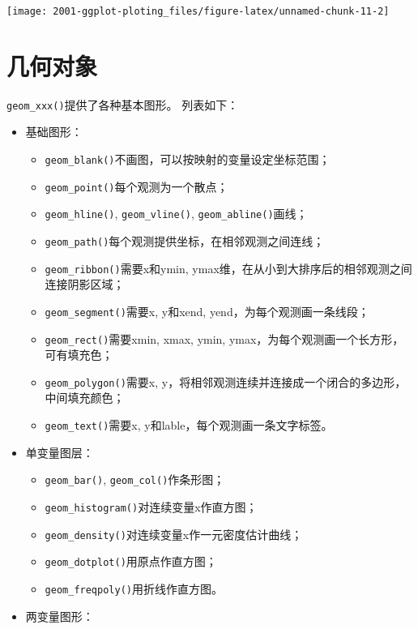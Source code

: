 \documentclass[
]{book}
\providecommand{\tightlist}{%
  \setlength{\itemsep}{0pt}\setlength{\parskip}{0pt}}
\begin{document}
\begin{center}\texttt{[image: 2001-ggplot-ploting\_files/figure-latex/unnamed-chunk-11-2]} \end{center}

\hypertarget{ux51e0ux4f55ux5bf9ux8c61}{%
\section{几何对象}\label{ux51e0ux4f55ux5bf9ux8c61}}

\texttt{geom\_xxx()}提供了各种基本图形。 列表如下：

\begin{itemize}
\item
  基础图形：

  \begin{itemize}
  \tightlist
  \item
    \texttt{geom\_blank()}不画图，可以按映射的变量设定坐标范围；
  \item
    \texttt{geom\_point()}每个观测为一个散点；
  \item
    \texttt{geom\_hline()}, \texttt{geom\_vline()}, \texttt{geom\_abline()}画线；
  \item
    \texttt{geom\_path()}每个观测提供坐标，在相邻观测之间连线；
  \item
    \texttt{geom\_ribbon()}需要x和ymin,
    ymax维，在从小到大排序后的相邻观测之间连接阴影区域；
  \item
    \texttt{geom\_segment()}需要x, y和xend, yend，为每个观测画一条线段；
  \item
    \texttt{geom\_rect()}需要xmin, xmax, ymin,
    ymax，为每个观测画一个长方形，可有填充色；
  \item
    \texttt{geom\_polygon()}需要x,
    y，将相邻观测连续并连接成一个闭合的多边形，中间填充颜色；
  \item
    \texttt{geom\_text()}需要x, y和lable，每个观测画一条文字标签。
  \end{itemize}
\item
  单变量图层：

  \begin{itemize}
  \tightlist
  \item
    \texttt{geom\_bar()}, \texttt{geom\_col()}作条形图；
  \item
    \texttt{geom\_histogram()}对连续变量x作直方图；
  \item
    \texttt{geom\_density()}对连续变量x作一元密度估计曲线；
  \item
    \texttt{geom\_dotplot()}用原点作直方图；
  \item
    \texttt{geom\_freqpoly()}用折线作直方图。
  \end{itemize}
\item
  两变量图形：


\end{itemize}
\end{document}
